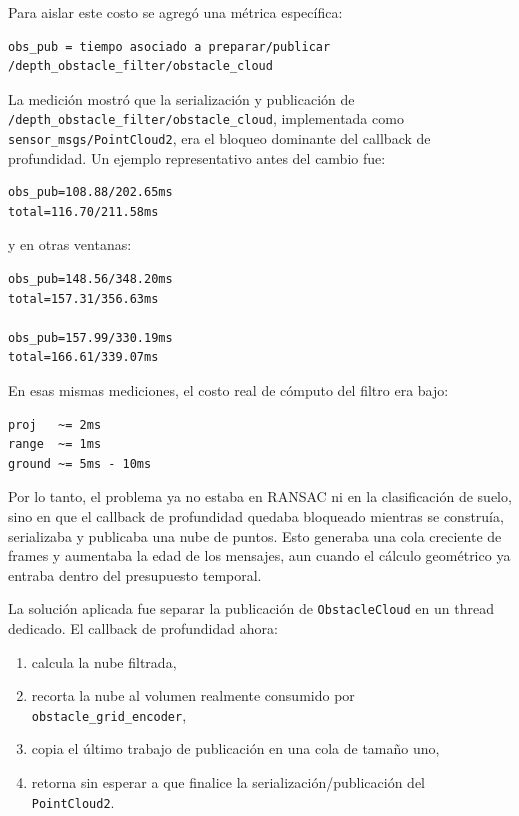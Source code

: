 Para aislar este costo se agregó una métrica específica:

\begin{verbatim}
obs_pub = tiempo asociado a preparar/publicar /depth_obstacle_filter/obstacle_cloud
\end{verbatim}

La medición mostró que la serialización y publicación de
\texttt{/depth\_obstacle\_filter/obstacle\_cloud}, implementada como
\texttt{sensor\_msgs/PointCloud2}, era el bloqueo dominante del callback de
profundidad. Un ejemplo representativo antes del cambio fue:

\begin{verbatim}
obs_pub=108.88/202.65ms
total=116.70/211.58ms
\end{verbatim}

y en otras ventanas:

\begin{verbatim}
obs_pub=148.56/348.20ms
total=157.31/356.63ms

obs_pub=157.99/330.19ms
total=166.61/339.07ms
\end{verbatim}

En esas mismas mediciones, el costo real de cómputo del filtro era bajo:

\begin{verbatim}
proj   ~= 2ms
range  ~= 1ms
ground ~= 5ms - 10ms
\end{verbatim}

Por lo tanto, el problema ya no estaba en RANSAC ni en la clasificación de
suelo, sino en que el callback de profundidad quedaba bloqueado mientras se
construía, serializaba y publicaba una nube de puntos. Esto generaba una cola
creciente de frames y aumentaba la edad de los mensajes, aun cuando el cálculo
geométrico ya entraba dentro del presupuesto temporal.

La solución aplicada fue separar la publicación de \texttt{ObstacleCloud} en un
thread dedicado. El callback de profundidad ahora:

\begin{enumerate}
  \item calcula la nube filtrada,
  \item recorta la nube al volumen realmente consumido por
        \texttt{obstacle\_grid\_encoder},
  \item copia el último trabajo de publicación en una cola de tamaño uno,
  \item retorna sin esperar a que finalice la serialización/publicación del
        \texttt{PointCloud2}.
\end{enumerate}

